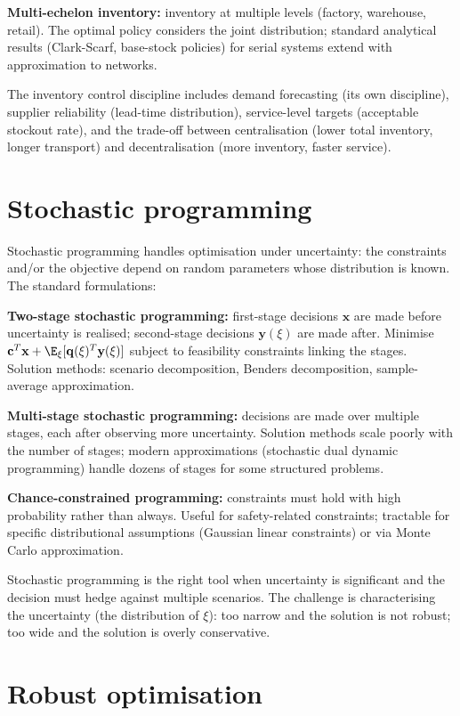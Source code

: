 \textbf{Multi-echelon inventory:} inventory at multiple levels (factory, warehouse, retail). The optimal policy considers the joint distribution; standard analytical results (Clark-Scarf, base-stock policies) for serial systems extend with approximation to networks.

The inventory control discipline includes demand forecasting (its own discipline), supplier reliability (lead-time distribution), service-level targets (acceptable stockout rate), and the trade-off between centralisation (lower total inventory, longer transport) and decentralisation (more inventory, faster service).

\section{Stochastic programming}

Stochastic programming handles optimisation under uncertainty: the constraints and/or the objective depend on random parameters whose distribution is known. The standard formulations:

\textbf{Two-stage stochastic programming:} first-stage decisions $\mathbf{x}$ are made before uncertainty is realised; second-stage decisions $\mathbf{y}(\xi)$ are made after. Minimise $\mathbf{c}^T \mathbf{x} + \E_\xi[\mathbf{q}(\xi)^T \mathbf{y}(\xi)]$ subject to feasibility constraints linking the stages. Solution methods: scenario decomposition, Benders decomposition, sample-average approximation.

\textbf{Multi-stage stochastic programming:} decisions are made over multiple stages, each after observing more uncertainty. Solution methods scale poorly with the number of stages; modern approximations (stochastic dual dynamic programming) handle dozens of stages for some structured problems.

\textbf{Chance-constrained programming:} constraints must hold with high probability rather than always. Useful for safety-related constraints; tractable for specific distributional assumptions (Gaussian linear constraints) or via Monte Carlo approximation.

Stochastic programming is the right tool when uncertainty is significant and the decision must hedge against multiple scenarios. The challenge is characterising the uncertainty (the distribution of $\xi$): too narrow and the solution is not robust; too wide and the solution is overly conservative.

\section{Robust optimisation}


